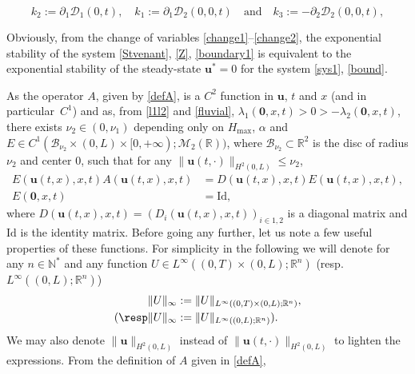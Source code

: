 \[
k_{2}:=\partial_{1} \mathcal{D}_{1}(0,t),\quad k_{1}:=\partial_{1}\mathcal{D}_{2}(0,0,t)\quad\text{and}\quad k_{3}:=-\partial_{2}\mathcal{D}_{2}(0,0,t),
\]
\begin{rmk}
Obviously, from the change of variables \eqref{change1}--\eqref{change2}, the exponential stability of
the system \eqref{Stvenant}, \eqref{Z}, \eqref{boundary1}
is equivalent to the exponential stability of the steady-state $\boldsymbol{u}^{*}=0$ for the system \eqref{sys1}, \eqref{bound}.
\label{r1}
\end{rmk}
As the operator $A$, given by \eqref{defA}, is a {$C^{2}$ function in $\boldsymbol{u}$,
$t$ and $x$ (and {in particular~$C^{1}$})}
and as, from \eqref{l1l2} and \eqref{fluvial}, $\lambda_{1}(\boldsymbol{0},x,t)>0>-\lambda_{2}(\boldsymbol{0},x,t)$,
there exists $\nu_{2}\in(0,\nu_{1})$ {depending only on $H_{\max}$, $\alpha$}
and $E\in C^{1}(\mathcal{B}_{\nu_{2}}\times(0,L)\times[0,+\infty);\mathcal{M}_{2}(\mathbb{R}))$, where
$\mathcal{B}_{\nu_{2}}\subset\mathbb{R}^{2}$ is the disc of radius $\nu_{2}$ and center $0$,
such that
for any $\lVert\boldsymbol{u}(t,\cdot)\rVert_{H^{2}(0,L)}\leq \nu_{2}$,
\begin{equation}
\begin{split}
E(\boldsymbol{u}(t,x),x,t)A(\boldsymbol{u}(t,x),x,t)&=D(\boldsymbol{u}(t,x),x,t)E(\boldsymbol{u}(t,x),x,t),\\
E(\boldsymbol{0},x,t)&=\mathrm{Id},
\end{split}
\label{definv}
\end{equation}
where $D(\boldsymbol{u}(t,x),x,t)=(D_{i}(\boldsymbol{u}(t,x),x,t))_{i\in{1,2}}$ is a diagonal matrix and $\mathrm{Id}$ is the identity matrix.
Before going any further, let us
note a few useful properties of these functions. {For simplicity in the following we will denote for any $n\in\mathbb{N}^{*}$ and any function $U\in L^{\infty}((0,T)\times(0,L);\mathbb{R}^{n})$ (resp. $L^{\infty}((0,L);\mathbb{R}^{n})$)
\begin{equation*}
\begin{split}
\lVert U\rVert_{\infty}&:=\lVert U\rVert_{L^{\infty}((0,T)\times(0,L);\mathbb{R}^{n})},\\
(\resp\lVert U\rVert_{\infty}&:=\lVert U\rVert_{L^{\infty}((0,L);\mathbb{R}^{n})}).
\end{split}
\end{equation*}
We may also denote $\lVert\boldsymbol{u}\rVert_{H^{2}(0,L)}$ instead of $\lVert\boldsymbol{u}(t,\cdot)\rVert_{H^{2}(0,L)}$ to lighten the expressions.}
From the definition of $A$ given in \eqref{defA},
